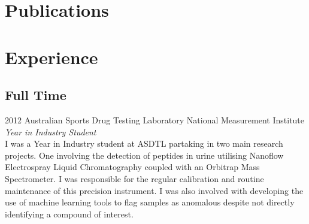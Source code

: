 \documentclass{friggeri-cv} %
\begin{document}

\section{Publications}



\pagebreak

\section{Experience}

\subsection{Full Time}

\begin{entrylist}


\entry
{2012}
{Australian Sports Drug Testing Laboratory}
{National Measurement Institute}
{\emph{Year in Industry Student} \\
I was a Year in Industry student at ASDTL partaking in two main research projects. One involving the detection of peptides in urine utilising Nanoflow Electrospray Liquid Chromatography coupled with an Orbitrap Mass Spectrometer. I was responsible for the regular calibration and routine maintenance of this precision instrument. I was also involved with developing the use of machine learning tools to flag samples as anomalous despite not directly identifying a compound of interest.}


\end{entrylist}
\end{document}
